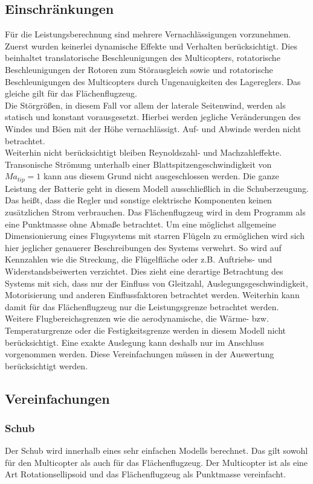 \subsection{Einschränkungen}
Für die Leistungsberechnung sind mehrere Vernachlässigungen vorzunehmen. Zuerst wurden keinerlei dynamische Effekte und Verhalten berücksichtigt. Dies beinhaltet translatorische Beschleunigungen des Multicopters, rotatorische Beschleunigungen der Rotoren zum Störausgleich sowie und rotatorische Beschleunigungen des Multicopters durch Ungenauigkeiten des Lagereglers. Das gleiche gilt für das Flächenflugzeug. \\
Die Störgrößen, in diesem Fall vor allem der laterale Seitenwind, werden als statisch und konstant vorausgesetzt. Hierbei werden jegliche Veränderungen des Windes und Böen mit der Höhe vernachlässigt. Auf- und Abwinde werden nicht betrachtet. \\
Weiterhin nicht berücksichtigt bleiben Reynoldszahl- und Machzahleffekte. Transonische Strömung unterhalb einer Blattspitzengeschwindigkeit von \ensuremath{Ma_{tip}=1} kann aus diesem Grund nicht ausgeschlossen werden.
Die ganze Leistung der Batterie geht in diesem Modell ausschließlich in die Schuberzeugung. Das heißt, dass die Regler und sonstige elektrische Komponenten keinen zusätzlichen Strom verbrauchen.
Das Flächenflugzeug wird in dem Programm als eine Punktmasse ohne Abmaße betrachtet. Um eine möglichst allgemeine Dimensionierung eines Flugsystems mit starren Flügeln zu ermöglichen wird sich hier jeglicher genauerer Beschreibungen des Systems verwehrt. So wird auf Kennzahlen wie die Streckung, die Flügelfläche oder z.B. Auftriebs- und Widerstandsbeiwerten verzichtet. Dies zieht eine derartige Betrachtung des Systems mit sich, dass nur der Einfluss von Gleitzahl, Auslegungsgeschwindigkeit, Motorisierung und anderen Einflussfaktoren betrachtet werden. Weiterhin kann damit für das Flächenflugzeug nur die Leistungsgrenze betrachtet werden. Weitere Flugbereichsgrenzen wie die aerodynamische, die Wärme- bzw. Temperaturgrenze oder die Festigkeitsgrenze werden in diesem Modell nicht berücksichtigt. 
Eine exakte Auslegung kann deshalb nur im Anschluss vorgenommen werden. Diese Vereinfachungen müssen in der Auswertung berücksichtigt werden.

\subsection{Vereinfachungen}
\subsubsection{Schub}
Der Schub wird innerhalb eines sehr einfachen Modells berechnet. Das gilt sowohl für den Multicopter als auch für das Flächenflugzeug. Der Multicopter ist als eine Art Rotationsellipsoid und das Flächenflugzeug als Punktmasse vereinfacht.

